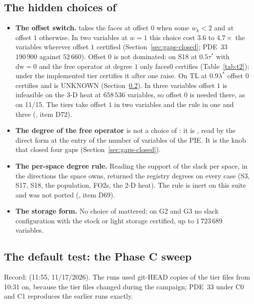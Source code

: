 \subsection{The hidden choices of }\label{sec:gaps-auto}

\begin{itemize}\setlength\itemsep{0pt}
\item \textbf{The offset switch.}  takes the faces at offset $0$ when some $w_k<2$ and at offset $1$ otherwise. In two variables at $w=1$ this choice cost $3.6$ to $4.7\times$ the variables wherever offset $1$ certified (Section~\ref{sec:gaps-closed}; PDE~33 $190\,900$ against $52\,660$). Offset $0$ is not dominated: on S18 at $0.5\tau^*$ with $\mathrm{dw}=0$ and the free operator at degree $1$ only faces0 certifies (Table~\ref{tab:t2}); under the implemented tier  certifies it after one raise. On TL at $0.9\lambda^*$ offset $0$ certifies and  is UNKNOWN (Section~\ref{sec:gaps-phasec}). In three variables offset $1$ is infeasible on the 3-D heat at $658\,536$ variables, so offset $0$ is needed there, as on 11/15. The tiers take offset $1$ in two variables and the rule in one and three (, item D72).
\item \textbf{The degree of the free operator} is not a choice of : it is , read by the direct form at the entry of the number of variables of the PIE. It is the knob that closed four gaps (Section~\ref{sec:gaps-closed}).
\item \textbf{The per-space degree rule.} Reading the support of the slack per space, in the directions the space owns, returned the registry degrees on every case (S3, S17, S18, the population, FO2s, the 2-D heat). The rule is inert on this suite and was not ported (, item D69).
\item \textbf{The storage form.} No choice of  mattered: on G2 and G3 no slack configuration with the stock or light storage certified, up to $1\,723\,689$ variables.
\end{itemize}

\subsection{The default test: the Phase C sweep}\label{sec:gaps-phasec}

Record:  (11:55, 11/17/2026). The runs used git-HEAD copies of the tier files from 10:31 on, because the tier files changed during the campaign; PDE~33 under C0 and C1 reproduces the earlier runs exactly.

